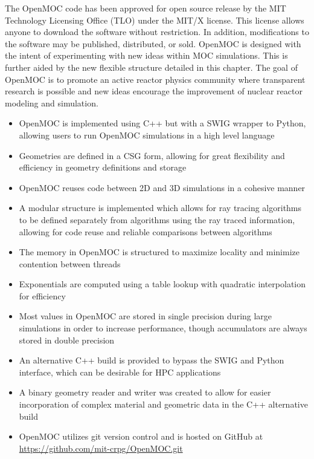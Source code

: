 The OpenMOC code has been approved for open source release by the MIT Technology Licensing Office (TLO) under the MIT/X license. This license allows anyone to download the software without restriction. In addition, modifications to the software may be published, distributed, or sold. OpenMOC is designed with the intent of experimenting with new ideas within \ac{MOC} simulations. This is further aided by the new flexible structure detailed in this chapter. The goal of OpenMOC is to promote an active reactor physics community where transparent research is possible and new ideas encourage the improvement of nuclear reactor modeling and simulation.

\newpage
\vfill
\begin{highlightsbox}[frametitle=Highlights]
	\begin{itemize}
		\item OpenMOC is implemented using C++ but with a \ac{SWIG} wrapper to Python, allowing users to run OpenMOC simulations in a high level language
		\item Geometries are defined in a \ac{CSG} form, allowing for great flexibility and efficiency in geometry definitions and storage
		\item OpenMOC reuses code between 2D and 3D simulations in a cohesive manner
		\item A modular structure is implemented which allows for ray tracing algorithms to be defined separately from algorithms using the ray traced information, allowing for code reuse and reliable comparisons between algorithms
		\item The memory in OpenMOC is structured to maximize locality and minimize contention between threads
		\item Exponentials are computed using a table lookup with quadratic interpolation for efficiency
		\item Most values in OpenMOC are stored in single precision during large simulations in order to increase performance, though accumulators are always stored in double precision
		\item An alternative C++ build is provided to bypass the \ac{SWIG} and Python interface, which can be desirable for \ac{HPC} applications
		\item A binary geometry reader and writer was created to allow for easier incorporation of complex material and geometric data in the C++ alternative build
		\item OpenMOC utilizes git version control and is hosted on GitHub at \url{https://github.com/mit-crpg/OpenMOC.git}
		
	\end{itemize}
\end{highlightsbox}
\vfill